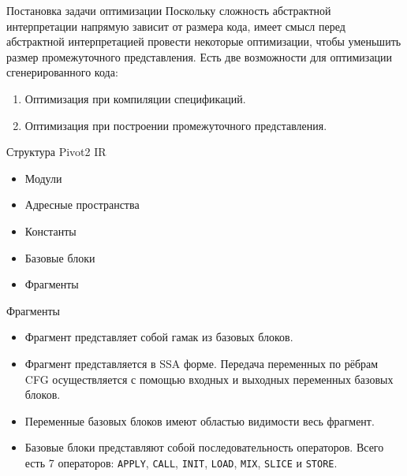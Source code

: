 \documentclass[presentation]{beamer}
\begin{document}
\begin{frame}[label={sec:orgf38626f}]{Постановка задачи оптимизации}
Поскольку сложность абстрактной интерпретации напрямую зависит от размера кода, имеет смысл перед абстрактной интерпретацией провести некоторые оптимизации, чтобы уменьшить размер промежуточного представления. Есть две возможности для оптимизации сгенерированного кода:
\begin{enumerate}
\item Оптимизация при компиляции спецификаций.
\item Оптимизация при построении промежуточного представления.
\end{enumerate}
\end{frame}
\begin{frame}[label={sec:org85279e6}]{Структура Pivot2 IR}
\begin{itemize}
\item Модули
\item Адресные пространства
\item Константы
\item Базовые блоки
\item Фрагменты
\end{itemize}
\end{frame}
\begin{frame}[label={sec:org81dfffe},fragile]{Фрагменты}
 \begin{itemize}
\item Фрагмент представляет собой гамак из базовых блоков.
\item Фрагмент представляется в SSA форме. Передача переменных по рёбрам CFG осуществляется с помощью входных и выходных переменных базовых блоков.
\item Переменные базовых блоков имеют областью видимости весь фрагмент.
\item Базовые блоки представляют собой последовательность операторов. Всего есть 7 операторов: \texttt{APPLY}, \texttt{CALL}, \texttt{INIT}, \texttt{LOAD}, \texttt{MIX}, \texttt{SLICE} и \texttt{STORE}.
\end{itemize}
\end{frame}
\end{document}
